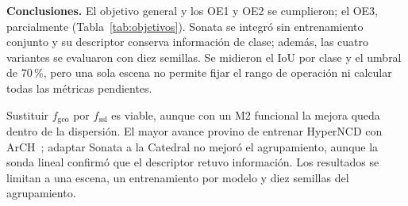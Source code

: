 \begingroup
\small
\setlength{\parskip}{2pt}

\noindent\textbf{Conclusiones.} El objetivo general y los OE1 y OE2 se cumplieron; el
OE3, parcialmente (Tabla~\ref{tab:objetivos}). Sonata se integró sin entrenamiento
conjunto y su descriptor conserva información de clase; además, las cuatro variantes
se evaluaron con diez semillas. Se midieron el IoU por clase y el umbral de 70\,\%,
pero una sola escena no permite fijar el rango de operación ni calcular todas las
métricas pendientes.

Sustituir $f_{\mathrm{geo}}$ por $f_{\mathrm{ssl}}$ es viable, aunque con un M2
funcional la mejora queda dentro de la dispersión. El mayor avance provino de entrenar
HyperNCD con ArCH~\cite{matrone2020benchmark}; adaptar Sonata a la Catedral no mejoró
el agrupamiento, aunque la sonda lineal confirmó que el descriptor retuvo información.
Los resultados se limitan a una escena, un entrenamiento por modelo y diez semillas
del agrupamiento.
